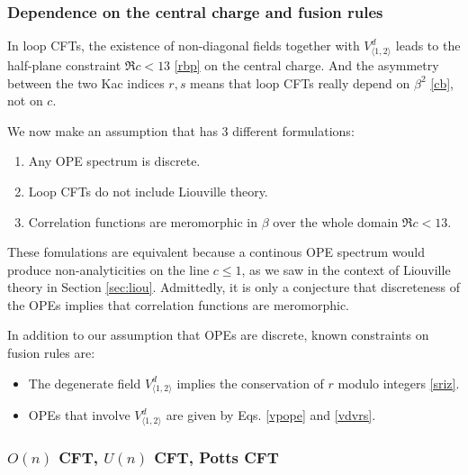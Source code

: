 \documentclass[12pt, a4paper]{article}
\theoremstyle{break}
\begin{document}
\subsubsection{Dependence on the central charge and fusion rules}

In loop CFTs, the existence of non-diagonal fields together with $V^d_{\langle 1,2\rangle}$ leads to the half-plane constraint $\Re c<13$ \eqref{rbp} on the central charge. And the asymmetry between the two Kac indices $r,s$ means that loop CFTs really depend on $\beta^2$ \eqref{cb}, not on $c$. 

We now make an assumption that has 3 different formulations:
\begin{enumerate}
 \item Any OPE spectrum is discrete.
 \item Loop CFTs do not include Liouville theory. 
 \item Correlation functions are meromorphic in $\beta$ over the whole domain $\Re c<13$.
\end{enumerate}
These fomulations are equivalent because a continous OPE spectrum would produce non-analyticities on the line $c\leq 1$, as we saw in the context of Liouville theory in Section \ref{sec:liou}. Admittedly, it is only a conjecture that discreteness of the OPEs implies that correlation functions are meromorphic.

In addition to our assumption that OPEs are discrete, known constraints on fusion rules are:
\begin{itemize}
 \item The degenerate field $V^d_{\langle 1,2\rangle}$ implies the conservation of $r$ modulo integers \eqref{sriz}.
 \item OPEs that involve $V^d_{\langle 1,2\rangle}$ are given by Eqs. \eqref{vpope} and \eqref{vdvrs}.
\end{itemize}

\subsubsection{$O(n)$ CFT, $U(n)$ CFT, Potts CFT}\label{sec:models}
\end{document}
